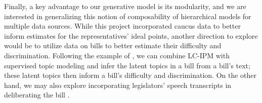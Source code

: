 \documentclass{article}
\begin{document}
Finally, a key advantage to our generative model is its modularity, and we are interested in generalizing this notion of composability of hierarchical models for multiple data sources. While this project incorporated caucus data to better inform estimates for the representatives' ideal points, another direction to explore would be to utilize data on bills to better estimate their difficulty and discrimination. Following the example of \cite{Gerrish2011}, we can combine LC-IPM with supervised topic modeling and infer the latent topics in a bill from a bill's text; these latent topics then inform a bill's difficulty and discrimination. On the other hand, we may also explore incorporating legislators' speech transcripts in deliberating the bill \cite{Quinn2006,Thomas2006}. \par
\end{document}
